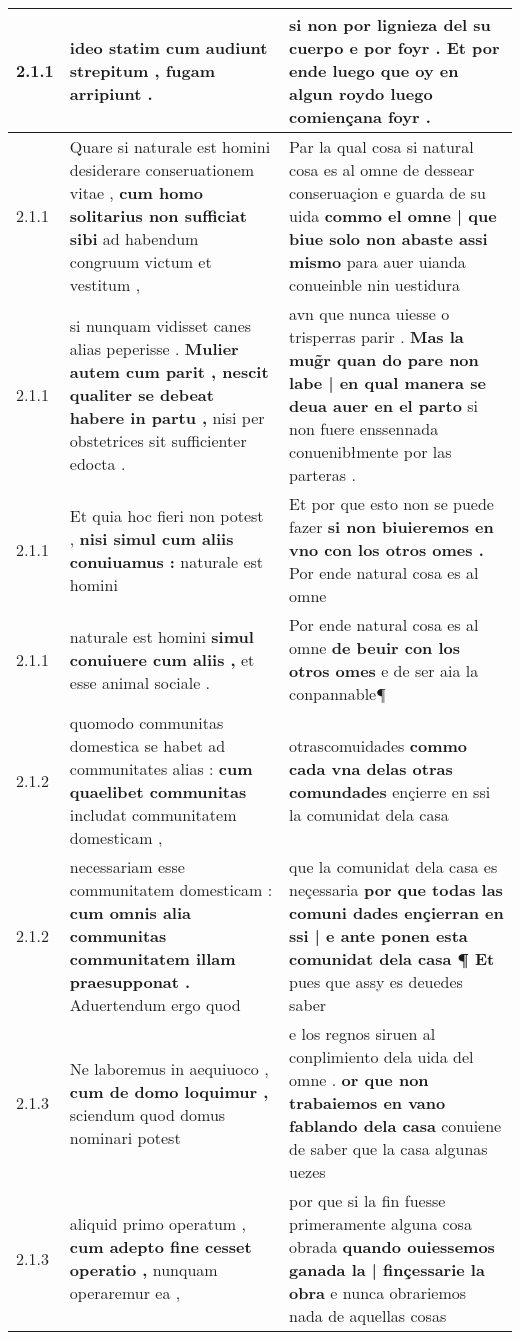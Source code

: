 \begin{tabular}{|p{1cm}|p{6.5cm}|p{6.5cm}|}
2.1.1 & ideo statim \textbf{ cum audiunt strepitum , } fugam arripiunt . & si non por lignieza del su cuerpo e por foyr . \textbf{ Et por ende luego que oy en algun roydo } luego comiençana foyr . \\\hline
2.1.1 & Quare si naturale est homini desiderare conseruationem vitae , \textbf{ cum homo solitarius non sufficiat sibi } ad habendum congruum victum et vestitum , & Par la qual cosa si natural cosa es al omne de dessear conseruaçion e guarda de su uida \textbf{ commo el omne | que biue solo non abaste assi mismo } para auer uianda conueinble nin uestidura \\\hline
2.1.1 & si nunquam vidisset canes alias peperisse . \textbf{ Mulier autem cum parit , nescit qualiter se debeat habere in partu , } nisi per obstetrices sit sufficienter edocta . & avn que nunca uiesse o trisperras parir . \textbf{ Mas la mug̃r quan do pare non labe | en qual manera se deua auer en el parto } si non fuere enssennada conuenibłmente por las parteras . \\\hline
2.1.1 & Et quia hoc fieri non potest , \textbf{ nisi simul cum aliis conuiuamus : } naturale est homini & Et por que esto non se puede fazer \textbf{ si non biuieremos en vno con los otros omes . } Por ende natural cosa es al omne \\\hline
2.1.1 & naturale est homini \textbf{ simul conuiuere cum aliis , } et esse animal sociale . & Por ende natural cosa es al omne \textbf{ de beuir con los otros omes } e de ser aia la conpannable¶ \\\hline
2.1.2 & quomodo communitas domestica se habet ad communitates alias : \textbf{ cum quaelibet communitas } includat communitatem domesticam , & otrascomuidades \textbf{ commo cada vna delas otras comundades } ençierre en ssi la comunidat dela casa \\\hline
2.1.2 & necessariam esse communitatem domesticam : \textbf{ cum omnis alia communitas communitatem illam praesupponat . } Aduertendum ergo quod & que la comunidat dela casa es neçessaria \textbf{ por que todas las comuni dades ençierran en ssi | e ante ponen esta comunidat dela casa ¶ Et } pues que assy es deuedes saber \\\hline
2.1.3 & Ne laboremus in aequiuoco , \textbf{ cum de domo loquimur , } sciendum quod domus nominari potest & e los regnos siruen al conplimiento dela uida del omne . \textbf{ or que non trabaiemos en vano fablando dela casa } conuiene de saber que la casa algunas uezes \\\hline
2.1.3 & aliquid primo operatum , \textbf{ cum adepto fine cesset operatio , } nunquam operaremur ea , & por que si la fin fuesse primeramente alguna cosa obrada \textbf{ quando ouiessemos ganada la | finçessarie la obra } e nunca obrariemos nada de aquellas cosas \\\hline

\end{tabular}
